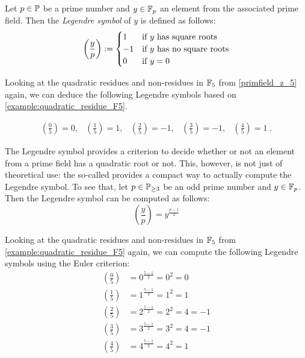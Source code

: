 Let $ p \in \mathbb{P} $ be a prime number and $ y \in \mathbb{F}_p $ an element from the associated prime field. Then the \textit{Legendre symbol} of $ y $ is defined as follows:
\begin{equation}
\label{eq: Legendre-symbol}
\left (\frac{y}{p} \right): =
\begin{cases}
1 & \text{if $ y $ has square roots} \\
-1 & \text{if $ y $ has no square roots} \\
0 & \text{if $ y = 0 $}
\end{cases}
\end{equation}
\begin{example}
Looking at the quadratic residues and non-residues in $\mathbb{F}_5$ from \examplename{} \ref{primfield_z_5} again, we can deduce the following Legendre symbols based on \examplename{} \ref{example:quadratic_residue_F5}.

$$
\begin{array}{ccccc}
\left (\frac{0}{5} \right) = 0, &
\left (\frac{1}{5} \right) = 1, &
\left (\frac{2}{5} \right) = -1, &
\left (\frac{3}{5} \right) = -1, &
\left (\frac{4}{5} \right) = 1 \;.
\end{array}
$$
\end{example}
The Legendre symbol provides a criterion to decide whether or not an element from a prime field has a quadratic root or not. This, however, is not just of theoretical use: the  so-called  provides a compact way to actually compute the Legendre symbol. To see that, let $ p \in \mathbb{P}_{\geq 3} $ be an odd prime number and $ y \in \mathbb{F}_p $. Then the Legendre symbol can be computed as follows:
\begin{equation}
\label{eq: Euler_criterion}
\left (\frac{y}{p} \right) = y^{\frac{p-1}{2}} 
\end{equation}
\begin{example}
Looking at the quadratic residues and non-residues in $\mathbb{F}_5$ from \examplename{} \ref{example:quadratic_residue_F5} again, we can compute the following Legendre symbols using the Euler criterion:
\begin{align*}
\left (\frac{0}{5} \right) &= 0^{\frac{5-1}{2}}= 0^2=0\\
\left (\frac{1}{5} \right) &= 1^{\frac{5-1}{2}}= 1^2=1\\
\left (\frac{2}{5} \right) &= 2^{\frac{5-1}{2}}= 2^2=4 = -1\\
\left (\frac{3}{5} \right) &= 3^{\frac{5-1}{2}}= 3^2=4 =-1\\
\left (\frac{4}{5} \right) &= 4^{\frac{5-1}{2}}= 4^2=1
\end{align*}
\end{example}
